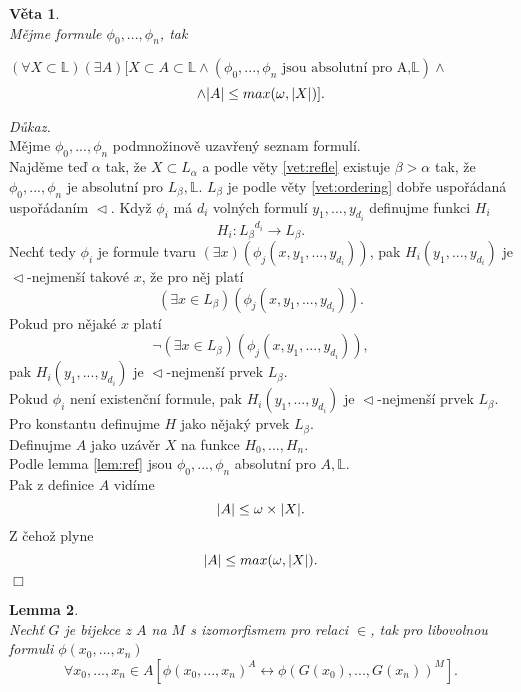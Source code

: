 \documentclass[12pt,a4paper]{article}
\newtheorem{veta}{V\v{e}ta}[section]%
\newtheorem{lemma}[veta]{Lemma}
\newenvironment{proof}
{\noindent \textit{D\r{u}kaz.}}
{\hspace*{\fill} $\Box$}
\begin{document}
\begin{veta}~\\
M\v{e}jme formule $\phi_0,...,\phi_{n}$, tak \begin{center}
$ (\forall X \subset \mathbb{L}) (\exists A)[X \subset A \subset  \mathbb{L} \wedge (\phi_0,...,\phi_{n} \text{ jsou absolutn\'{i} pro A,}\mathbb{L})\wedge$
\[ \wedge \arrowvert A\arrowvert \leq max(\omega,\arrowvert X\arrowvert )] .\]
\end{center}
\label{vet:LSt}
\end{veta}  
\begin{proof}~\\
M\v{e}jme $ \phi_0,...,\phi_{n} $ podmno\v{z}inov\v{e} uzav\v{r}en\'{y} seznam formul\'{i}.\\ 
Najd\v{e}me te\v{d} $ \alpha  $ tak, \v{z}e $ X \subset L_\alpha $ a podle v\v{e}ty \ref{vet:refle} existuje $ \beta > \alpha  $ tak, \v{z}e $ \phi_0,...,\phi_{n} $ je absolutn\'{i} pro $ L_\beta , \mathbb{L}$.
$ L_\beta $ je podle v\v{e}ty \ref{vet:ordering} dob\v{r}e uspo\v{r}\'{a}dan\'{a} uspo\v{r}\'{a}dan\'{i}m $ \vartriangleleft $.
Kdy\v{z} $ \phi_i  $ m\'{a} $ d_i $ voln\'{y}ch formul\'{i} $ y_1,...,y_{d_i} $ definujme funkci $ H_i $
\[ H_i:{L_\beta}^{d_i} \rightarrow  {L_\beta} .\]
Nech\v{t} tedy $ \phi_i  $ je formule tvaru $ (\exists x)(\phi_j(x,y_1,...,y_{d_i})) $, pak 
$ H_i(y_1,...,y_{d_i}) $ je $ \vartriangleleft $-nejmen\v{s}\'{i} takov\'{e} $x$, \v{z}e pro n\v{e}j plat\'{i}\[ (\exists x \in L_\beta)(\phi_j(x,y_1,...,y_{d_i}) ).\]
Pokud pro n\v{e}jak\'{e} $x$ plat\'{i} 
\[\neg (\exists x \in L_\beta)(\phi_j(x,y_1,...,y_{d_i}) ),\] pak $ H_i(y_1,...,y_{d_i}) $ je $ \vartriangleleft $-nejmen\v{s}\'{i} prvek $ L_\beta $. \\ Pokud $ \phi_i  $ nen\'{i} existen\v{c}n\'{i} formule, pak $ H_i(y_1,...,y_{d_i}) $ je $ \vartriangleleft $-nejmen\v{s}\'{i} prvek $ L_\beta $. \\
Pro konstantu definujme $ H $ jako n\v{e}jak\'{y} prvek $ L_\beta $.\\
Definujme $ A $ jako uz\'{a}v\v{e}r $X$ na funkce $ H_0,...,H_n $. \\Podle lemma \ref{lem:ref} jsou $\phi_0,...,\phi_{n}$ absolutn\'{i} pro $A, \mathbb{L} $.\\
Pak z definice $ A  $ vid\'{i}me 
\[ \arrowvert A\arrowvert \leq \omega \times \arrowvert X \arrowvert .\]
Z \v{c}eho\v{z} plyne
\[ \arrowvert A\arrowvert \leq max(\omega,\arrowvert X \arrowvert) .\]
\end{proof}
\begin{lemma}~\\
Nech\v{t} $  G $ je bijekce z $ A $ na $ M $ s izomorfismem pro relaci $ \in $, tak pro libovolnou formuli $ \phi(x_0,...,x_n) $ 
\[ \forall x_0,...,x_n \in A [  \phi(x_0,...,x_n)^A \leftrightarrow  \phi(G(x_0),...,G(x_n))^M   ] .\]
\label{lem:bij}
\end{lemma}
\end{document}
